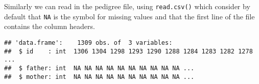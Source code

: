 \documentclass[
  12pt,
]{book}
\newenvironment{Shaded}{\begin{snugshade}}{\end{snugshade}}
\newcommand{\FunctionTok}[1]{\textcolor[rgb]{0.00,0.00,0.00}{#1}}
\newcommand{\NormalTok}[1]{#1}
\newcommand{\OtherTok}[1]{\textcolor[rgb]{0.56,0.35,0.01}{#1}}
\newcommand{\SpecialCharTok}[1]{\textcolor[rgb]{0.00,0.00,0.00}{#1}}
\begin{document}
\begin{Shaded}
\end{Shaded}

Similarly we can read in the pedigree file, using \texttt{read.csv()} which consider by default that \texttt{NA} is the symbol for missing values and that the first line of the file contains the column headers.

\begin{verbatim}
## 'data.frame':    1309 obs. of  3 variables:
##  $ id    : int  1306 1304 1298 1293 1290 1288 1284 1283 1282 1278 ...
##  $ father: int  NA NA NA NA NA NA NA NA NA NA ...
##  $ mother: int  NA NA NA NA NA NA NA NA NA NA ...
\end{verbatim}

\begin{Shaded}
\end{Shaded}
\end{document}
